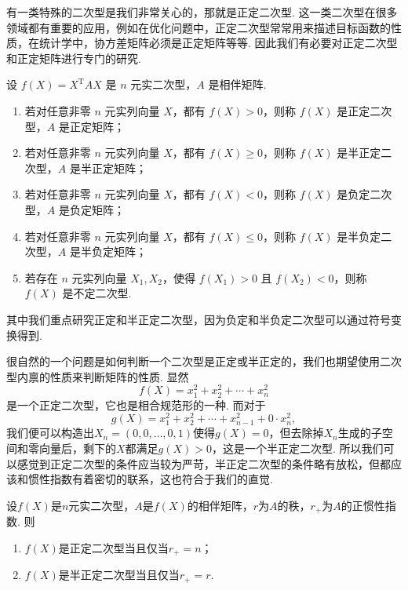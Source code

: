 有一类特殊的二次型是我们非常关心的，那就是正定二次型. 这一类二次型在很多领域都有重要的应用，例如在优化问题中，正定二次型常常用来描述目标函数的性质，在统计学中，协方差矩阵必须是正定矩阵等等. 因此我们有必要对正定二次型和正定矩阵进行专门的研究.

\begin{definition}{}{}
    设 $f(X) = X^\mathrm{T}AX$ 是 $n$ 元实二次型，$A$ 是相伴矩阵.
    \begin{enumerate}
        \item 若对任意非零 $n$ 元实列向量 $X$，都有 $f(X) > 0$，则称 $f(X)$ 是正定二次型，$A$ 是正定矩阵；
        \item 若对任意非零 $n$ 元实列向量 $X$，都有 $f(X) \geqslant 0$，则称 $f(X)$ 是半正定二次型，$A$ 是半正定矩阵；
        \item 若对任意非零 $n$ 元实列向量 $X$，都有 $f(X) < 0$，则称 $f(X)$ 是负定二次型，$A$ 是负定矩阵；
        \item 若对任意非零 $n$ 元实列向量 $X$，都有 $f(X) \leqslant 0$，则称 $f(X)$ 是半负定二次型，$A$ 是半负定矩阵；
        \item 若存在 $n$ 元实列向量 $X_1, X_2$，使得 $f(X_1) > 0$ 且 $f(X_2) < 0$，则称 $f(X)$ 是不定二次型.
    \end{enumerate}
\end{definition}

其中我们重点研究正定和半正定二次型，因为负定和半负定二次型可以通过符号变换得到.

很自然的一个问题是如何判断一个二次型是正定或半正定的，我们也期望使用二次型内禀的性质来判断矩阵的性质. 显然
\[f(X) = x_1^2 + x_2^2 + \cdots + x_n^2\]
是一个正定二次型，它也是相合规范形的一种. 而对于
\[g(X) = x_1^2 + x_2^2 + \cdots + x_{n - 1}^2 + 0 \cdot x_n^2,\]
我们便可以构造出$X_n=(0, 0, \ldots, 0, 1)$使得$g(X)=0$，但去除掉$X_n$生成的子空间和零向量后，剩下的$X$都满足$g(X) > 0$，这是一个半正定二次型. 所以我们可以感觉到正定二次型的条件应当较为严苛，半正定二次型的条件略有放松，但都应该和惯性指数有着密切的联系，这也符合于我们的直觉.

\begin{theorem}{}{}
    设$f(X)$是$n$元实二次型，$A$是$f(X)$的相伴矩阵，$r$为$A$的秩，$r_+$为$A$的正惯性指数. 则
    \begin{enumerate}
        \item $f(X)$是正定二次型当且仅当$r_+=n$；
        \item $f(X)$是半正定二次型当且仅当$r_+=r$.
    \end{enumerate}
\end{theorem}

